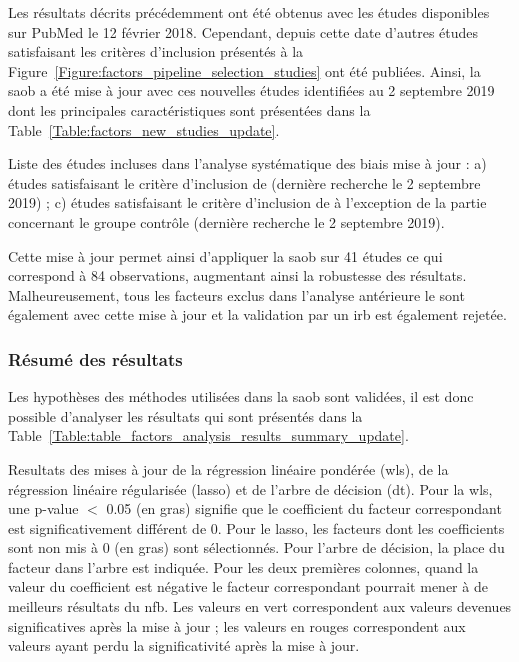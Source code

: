 Les résultats décrits précédemment ont été obtenus avec les études disponibles sur PubMed le 12 février 2018. Cependant, depuis cette date d'autres études satisfaisant
les critères d'inclusion présentés à la Figure~\ref{Figure:factors_pipeline_selection_studies} ont été publiées. Ainsi, la \gls{saob} a été mise à jour avec ces 
nouvelles études identifiées au 2 septembre 2019 dont les principales caractéristiques sont présentées dans la Table~\ref{Table:factors_new_studies_update}.

\begin{table}[h!]
  \centering
  \caption{Liste des études incluses dans l'analyse systématique des biais mise à jour : a) études satisfaisant le critère d'inclusion de \citet{Cortese2016} (dernière recherche 
	le 2 septembre 2019) ; c) études satisfaisant le critère d'inclusion de \citet{Cortese2016} à l'exception de la partie concernant le groupe contrôle 
	(dernière recherche le 2 septembre 2019).}
  
  \label{Table:factors_new_studies_update}
\end{table}

Cette mise à jour permet ainsi d'appliquer la \gls{saob} sur 41 études ce qui correspond à 84 observations, augmentant ainsi la robustesse des
résultats. Malheureusement, tous les facteurs exclus dans l'analyse antérieure le sont également avec cette mise à jour et la validation par
un \gls{irb} est également rejetée.

\subsubsection{Résumé des résultats} 

Les hypothèses des méthodes utilisées dans la \gls{saob} sont validées, il est donc possible d'analyser les résultats qui sont présentés dans la 
Table~\ref{Table:table_factors_analysis_results_summary_update}.

\begin{table}[h!]
  \centering
  \caption{Resultats des mises à jour de la régression linéaire pondérée (\gls{wls}), de la régression linéaire régularisée (\gls{lasso}) et de l'arbre de décision (\gls{dt}). Pour la \gls{wls}, une p-value $<$ 0.05 
	(en gras) signifie que le coefficient du facteur correspondant est significativement différent de 0. Pour le \gls{lasso}, les facteurs dont les coefficients sont non mis à 0 (en gras) sont 
	sélectionnés. Pour l'arbre de décision, la place du facteur dans l'arbre est indiquée. Pour les deux premières colonnes, quand la valeur du coefficient est négative le facteur 
	correspondant pourrait mener à de meilleurs résultats du \gls{nfb}. Les valeurs en vert correspondent aux valeurs devenues significatives après la mise à jour ; les valeurs
	en rouges correspondent aux valeurs ayant perdu la significativité après la mise à jour.}
  
  \label{Table:table_factors_analysis_results_summary_update}
\end{table}

